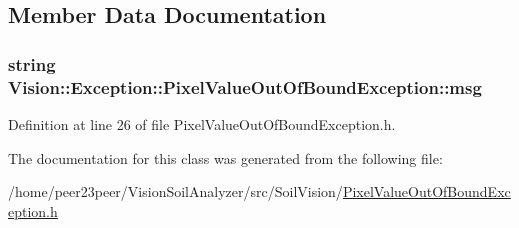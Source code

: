 \subsection{Member Data Documentation}
\hypertarget{class_vision_1_1_exception_1_1_pixel_value_out_of_bound_exception_a5e1cb97c34bdedca34b733d5cf16f8c2}{}
\subsubsection[{msg}]{\setlength{\rightskip}{0pt plus 5cm}string Vision\+::\+Exception\+::\+Pixel\+Value\+Out\+Of\+Bound\+Exception\+::msg\hspace{0.3cm}{\ttfamily [private]}}\label{class_vision_1_1_exception_1_1_pixel_value_out_of_bound_exception_a5e1cb97c34bdedca34b733d5cf16f8c2}


Definition at line 26 of file Pixel\+Value\+Out\+Of\+Bound\+Exception.\+h.



The documentation for this class was generated from the following file\+:\begin{DoxyCompactItemize}
\item 
/home/peer23peer/\+Vision\+Soil\+Analyzer/src/\+Soil\+Vision/\hyperlink{_pixel_value_out_of_bound_exception_8h}{Pixel\+Value\+Out\+Of\+Bound\+Exception.\+h}\end{DoxyCompactItemize}

